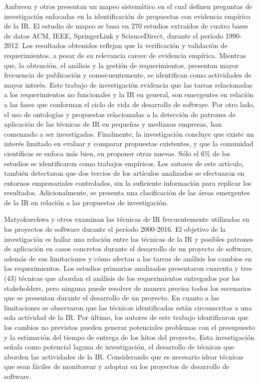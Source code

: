 \documentclass[journal]{IEEEtran}
\begin{document}
Ambreen y otros \cite{ambreen2018empirical} presentan un mapeo sistemático en el cual definen preguntas de investigación enfocadas en la identificación de propuestas con evidencia empírica de la IR. El estudio de mapeo se basa en 270 estudios extraídos de cuatro bases de datos ACM, IEEE, SpringerLink y ScienceDirect, durante el período 1990-2012. Los resultados obtenidos reflejan que la verificación y validación de requerimientos, a pesar de su relevancia carece de evidencia empírica. Mientras que, la obtención, el análisis y la gestión de requerimientos, presentan mayor frecuencia de publicación y consecuentemente, se identifican como actividades de mayor interés. Este trabajo de investigación evidencia que las tareas relacionadas a los requerimientos no funcionales y la IR en general, son emergentes en relación a las fases que conforman el ciclo de vida de desarrollo de software. Por otro lado, el uso de ontologías y propuestas relacionadas a la detección de patrones de aplicación de las técnicas de IR en pequeñas y medianas empresas, han comenzado a ser investigadas. Finalmente, la investigación concluye que existe un interés limitado en evaluar y comparar propuestas existentes, y que la comunidad científicas se enfoca más bien, en proponer otras nuevas. Sólo el 6\% de los estudios se identificaron como trabajos empíricos. Los autores de este artículo, también detectaron que dos tercios de los artículos analizados se efectuaron en entornos empresariales controlados, sin la suficiente información  para replicar los resultados. Adicionalmente, se presenta una clasificación de las áreas emergentes de la IR en relación a las propuestas de investigación. 

Matyokurehwa y otros \cite{matyokurehwa2017requirements} examinan las técnicas de IR frecuentemente utilizadas en los proyectos de software durante el período 2000-2016. El objetivo de la investigación es hallar una relación entre las técnicas de la IR y posibles patrones de aplicación en casos concretos durante el desarrollo de un proyecto de software, además de sus limitaciones y cómo afectan a las tareas de análisis los cambios en los requerimientos. Los estudios primarios analizados presentaron cuarenta y tres (43) técnicas que abordan el análisis de los requerimientos entregados por los stakeholders, pero ninguna puede resolver de manera precisa todos los escenarios que se presentan durante el desarrollo de un proyecto. En cuanto a las limitaciones se observaron que las técnicas identificadas están circunscritas a una sola actividad de la IR. Por último, los autores de este trabajo identificaron que los cambios no previstos pueden generar potenciales problemas con el presupuesto y la estimación del tiempo de entrega de los hitos del proyecto. Esta investigación señala como potencial laguna de investigación, el desarrollo de técnicas que aborden las actividades de la IR. Considerando que es necesario idear técnicas que sean fáciles de monitorear y adoptar en los proyectos de desarrollo de software.
\end{document}
